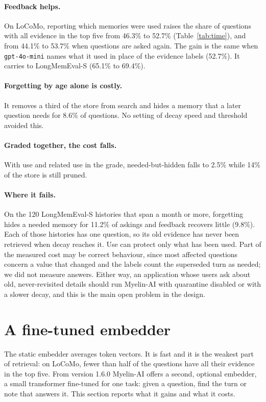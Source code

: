 \documentclass[11pt]{article}
\begin{document}
\paragraph{Feedback helps.} On LoCoMo, reporting which memories were
used raises the share of questions with all evidence in the top five
from 46.3\% to 52.7\% (Table~\ref{tab:time}), and from 44.1\% to
53.7\% when questions are asked again. The gain is the same when
\texttt{gpt-4o-mini} names what it used in place of the evidence
labels (52.7\%). It carries to LongMemEval-S (65.1\% to 69.4\%).

\paragraph{Forgetting by age alone is costly.} It removes a third of
the store from search and hides a memory that a later question needs
for 8.6\% of questions. No setting of decay speed and threshold
avoided this.

\paragraph{Graded together, the cost falls.} With use and related use
in the grade, needed-but-hidden falls to 2.5\% while 14\% of the store
is still pruned.

\paragraph{Where it fails.} On the 120 LongMemEval-S histories that
span a month or more, forgetting hides a needed memory for 11.2\% of
askings and feedback recovers little (9.8\%). Each of those histories
has one question, so its old evidence has never been retrieved when
decay reaches it. Use can protect only what has been used. Part of the
measured cost may be correct behaviour, since most affected questions
concern a value that changed and the labels count the superseded turn
as needed; we did not measure answers. Either way, an application
whose users ask about old, never-revisited details should run \mbox{Myelin-AI}
with quarantine disabled or with a slower decay, and this is the main
open problem in the design.

\section{A fine-tuned embedder}
\label{sec:embedder}

The static embedder averages token vectors. It is fast and it is the
weakest part of retrieval: on LoCoMo, fewer than half of the questions
have all their evidence in the top five. From version 1.6.0
\mbox{Myelin-AI} offers a second, optional embedder, a small
transformer fine-tuned for one task: given a question, find the turn or
note that answers it. This section reports what it gains and what it
costs.
\end{document}
